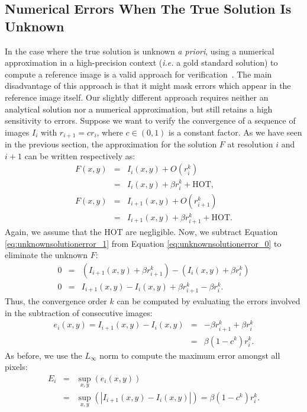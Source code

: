 \subsection{Numerical Errors When The True Solution Is Unknown}

In the case where the true solution is unknown {\em a priori}, using a numerical approximation in
a high-precision context ({\em i.e.} a gold standard solution) to compute a reference image is a valid
approach for verification~\cite{Kronander10}.  The main disadvantage
of this approach is that it might mask errors which appear in the reference image
itself.
%
Our slightly different approach requires
neither an analytical solution nor a numerical approximation, but
still retains a high sensitivity to errors. Suppose
we want to verify the convergence of a sequence of images ${I_i}$
with $r_{i+1} = c r_{i}$, where $c \in (0,1)$ is a constant
factor. 
%
As we have seen in the previous section, the approximation for the
solution $F$ at resolution $i$ and $i+1$ can be written respectively as: 
\begin{eqnarray}
F(x,y) &=&I_i(x,y) + O(r_i^k) \nonumber\\
&=& I_i(x,y) + \beta r_i^k + \text{HOT},\label{eq:unknownsolutionerror_0} \\
F(x,y) &=& I_{i+1}(x,y) + O(r_{i+1}^k) \nonumber\\
&=& I_{i+1}(x,y) + \beta
r_{i+1}^k + \text{HOT}. \label{eq:unknownsolutionerror_1}
\end{eqnarray}
Again, we assume that the HOT are negligible. Now, we 
subtract Equation \eqref{eq:unknownsolutionerror_1} from
Equation \eqref{eq:unknownsolutionerror_0} to eliminate the unknown $F$:
\begin{eqnarray}
0 &=& (I_{i+1}(x,y) + \beta r_{i+1}^k) - (I_i(x,y) + \beta r_i^k)\\
0 &=& I_{i+1}(x,y)-I_{i}(x,y) + \beta r_{i+1}^k - \beta r_i^k.
\end{eqnarray}
Thus, the convergence order $k$ can be computed by evaluating the errors
involved in the subtraction of consecutive images:
\begin{eqnarray}
e_i(x,y) = I_{i+1}(x,y)-I_{i}(x,y) &=& -\beta r_{i+1}^k + \beta r_i^k\\
  &=& \beta(1 -c^k) r_i^k.
\end{eqnarray}
As before, we use the $L_\infty$ norm to compute the maximum error amongst
all pixels:
\begin{eqnarray}
E_i &=& \sup_{x,y}(e_i(x,y))\nonumber\\ 
    &=& \sup_{x,y}(|I_{i+1}(x,y)-I_{i}(x,y)|) = \beta(1-c^k) r_i^k.\label{eq:unknownsolutionerror}
\end{eqnarray}
